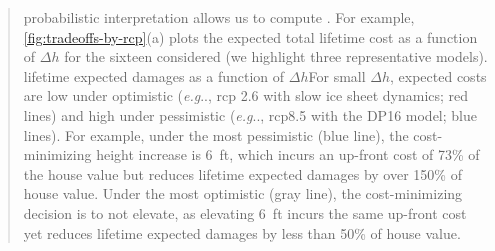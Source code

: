 \documentclass{ar2rc}
\makeatletter
\DeclareRobustCommand\onedot{\futurelet\@let@token\@onedot}
\def\@onedot{\ifx\@let@token.\else.\null\fi\xspace}
\def\eg{\emph{e.g}\onedot} \def\Eg{\emph{E.g}\onedot}
\makeatother
\begin{document}
\begin{quote}
    \DIFdelbegin {}\DIFdelend \DIFaddbegin {}\DIFaddend probabilistic interpretation allows us to compute \DIFdelbegin {}\DIFdelend \DIFaddbegin {}\DIFaddend .
    For example, \cref{fig:tradeoffs-by-rcp}(a) plots the expected total lifetime cost as a function of $\Delta h$ for the sixteen \DIFdelbegin {}\DIFdelend \DIFaddbegin {}\DIFaddend considered (we highlight three representative models).
    \DIFdelbegin {}\DIFdelend \DIFaddbegin {}\DIFaddend lifetime expected damages as a function of $\Delta h$\DIFdelbegin {}\DIFdelend \DIFaddbegin {}\DIFaddend For small $\Delta h$, expected costs are low under optimistic \DIFdelbegin {}\DIFdelend \DIFaddbegin {}\DIFaddend (\eg, \gls{rcp} 2.6 with slow ice sheet dynamics; red lines) and high under pessimistic \DIFdelbegin {}\DIFdelend \DIFaddbegin {}\DIFaddend (\eg, \gls{rcp}8.5 with the DP16 model; blue lines).
    \DIFaddbegin {}\DIFaddend For example, under the most pessimistic \DIFdelbegin {}\DIFdelend \DIFaddbegin {}\DIFaddend (blue line), the cost-minimizing height increase is \SI{6}{ft}, which incurs an up-front cost of 73\% of the house value but reduces lifetime expected damages by over 150\% of house value.
    Under the most optimistic \DIFdelbegin {}\DIFdelend \DIFaddbegin {}\DIFaddend (gray line), the cost-minimizing decision is to not elevate, as elevating \SI{6}{ft} incurs the same up-front cost yet reduces lifetime expected damages by less than 50\% of house value.
\end{quote}
\end{document}
